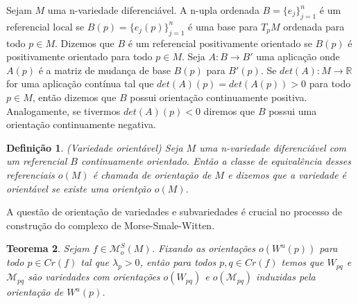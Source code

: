 \documentclass[12pt]{book}
\newtheorem{teorema}{Teorema}[section]
\newtheorem{definicao}[teorema]{Definição}
\newcommand{\espacomoduli}[2]{\mathcal{M}_{#1#2}}
\newcommand{\espacotangenteponto}[2]{T_{#1}#2}
\newcommand{\funcoesmorsesmale}[1]{\mathcal{M}^{S}_{o}(#1)}
\newcommand{\pontoscriticos}[1]{\textit{Cr}(#1)}
\newcommand{\real}[1]{\mathbb{R}^{#1}}
\newcommand{\reta}{\real{}}
\newcommand{\variedadeconectantepontos}[2]{W_{#1#2}}
\newcommand{\variedadeinstavel}[1]{W^{u}(#1)}
\begin{document}
	Sejam $M$ uma n-variedade diferenciável. A n-upla ordenada $B=\{e_{j}\}_{j=1}^{n}$ é um referencial local se $B(p)=\{e_{j}(p)\}_{j=1}^{n}$ é uma base para $\espacotangenteponto{p}{M}$ ordenada para todo $p \in M$. Dizemos que $B$ é um referencial positivamente orientado se $B(p)$ é positivamente orientado para todo $p \in M$. Seja $A: B \to B'$ uma aplicação onde $A(p)$ é a matriz de mudança de base $B(p) $ para $B'(p)$. Se $det(A):M \to \reta$ for uma aplicação contínua tal que $det(A)(p) = det(A(p))>0$ para todo $p \in M$, então dizemos que $B$ possui orientação continuamente positiva. Analogamente, se tivermos $det(A)(p)<0$ diremos que $B$ possui uma orientação continuamente negativa.
	
	\begin{definicao}
		(Variedade orientável) Seja $M$ uma n-variedade diferenciável com um referencial $B$ continuamente orientado. Então a classe de equivalência desses referenciais $o(M)$ é chamada de orientação de $M$ e dizemos que a variedade é orientável se existe uma orientção $o(M)$.
	\end{definicao}
	
	A questão de orientação de variedades e subvariedades é crucial no processo de construção do complexo de Morse-Smale-Witten.
	
	\begin{teorema}\label{teorema_orientacao_variedade_instavel}
		Sejam $f \in \funcoesmorsesmale{M}$. Fixando as orientações $o(\variedadeinstavel{p})$ para todo $p \in \pontoscriticos{f}$ tal que $\lambda_{p}>0$, então para todos $p,q \in \pontoscriticos{f}$ temos que $\variedadeconectantepontos{p}{q}$ e $\espacomoduli{p}{q}$ são variedades com orientações $o(\variedadeconectantepontos{p}{q})$ e $o(\espacomoduli{p}{q})$ induzidas pela orientação de $\variedadeinstavel{p}$.
	\end{teorema}
	
\end{document}
